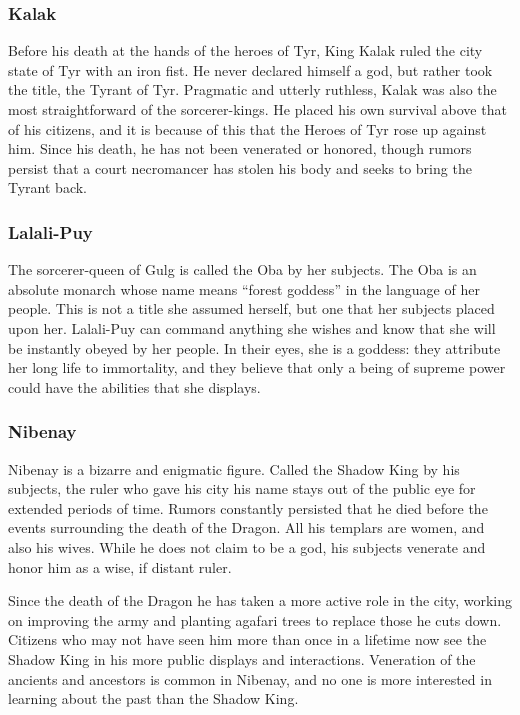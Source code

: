 \subsubsection{Kalak}
Before his death at the hands of the heroes of Tyr, King Kalak ruled the city state of Tyr with an iron fist. He never declared himself a god, but rather took the title, the Tyrant of Tyr. Pragmatic and utterly ruthless, Kalak was also the most straightforward of the sorcerer-kings. He placed his own survival above that of his citizens, and it is because of this that the Heroes of Tyr rose up against him. Since his death, he has not been venerated or honored, though rumors persist that a court necromancer has stolen his body and seeks to bring the Tyrant back.

\subsubsection{Lalali-Puy}
The sorcerer-queen of Gulg is called the Oba by her subjects. The Oba is an absolute monarch whose name means ``forest goddess'' in the language of her people. This is not a title she assumed herself, but one that her subjects placed upon her. Lalali-Puy can command anything she wishes and know that she will be instantly obeyed by her people. In their eyes, she is a goddess: they attribute her long life to immortality, and they believe that only a being of supreme power could have the abilities that she displays.

\subsubsection{Nibenay}
Nibenay is a bizarre and enigmatic figure. Called the Shadow King by his subjects, the ruler who gave his city his name stays out of the public eye for extended periods of time. Rumors constantly persisted that he died before the events surrounding the death of the Dragon. All his templars are women, and also his wives. While he does not claim to be a god, his subjects venerate and honor him as a wise, if distant ruler.

Since the death of the Dragon he has taken a more active role in the city, working on improving the army and planting agafari trees to replace those he cuts down. Citizens who may not have seen him more than once in a lifetime now see the Shadow King in his more public displays and interactions. Veneration of the ancients and ancestors is common in Nibenay, and no one is more interested in learning about the past than the Shadow King.

